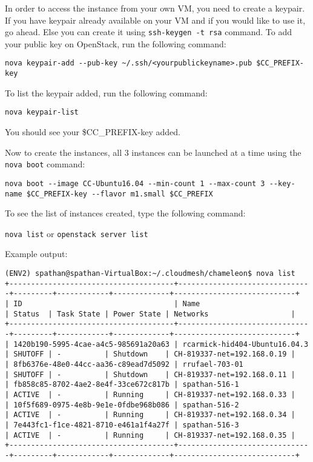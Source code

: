 In order to access the instance from your own VM, you need to create a
keypair. If you have keypair already available on your VM and if you
would like to use it, go ahead. Else you can create it using
\texttt{ssh-keygen\ -t\ rsa} command. To add your public key on
OpenStack, run the following command:

\texttt{nova\ keypair-add\ -\/-pub-key\ \textasciitilde{}/.ssh/\textless{}yourpublickeyname\textgreater{}.pub\ \$CC\_PREFIX-key}

To list the keypair added, run the following command:

\texttt{nova\ keypair-list}

You should see your \$CC\_PREFIX-key added.

Now to create the instances, all 3 instances can be launched at a time
using the \texttt{nova\ boot} command:

\texttt{nova\ boot\ -\/-image\ CC-Ubuntu16.04\ -\/-min-count\ 1\ -\/-max-count\ 3\ -\/-key-name\ \$CC\_PREFIX-key\ -\/-flavor\ m1.small\ \$CC\_PREFIX}

To see the list of instances created, type the following command:

\texttt{nova\ list} or \texttt{openstack\ server\ list}

Example output:

\begin{lstlisting}
(ENV2) spathan@spathan-VirtualBox:~/.cloudmesh/chameleon$ nova list
+--------------------------------------+-------------------------------+---------+------------+-------------+----------------------------+
| ID                                   | Name                          | Status  | Task State | Power State | Networks                   |
+--------------------------------------+-------------------------------+---------+------------+-------------+----------------------------+
| 1420b190-5995-4cae-a4c5-985691a20a63 | rcarmick-hid404-Ubuntu16.04.3 | SHUTOFF | -          | Shutdown    | CH-819337-net=192.168.0.19 |
| 8fb6376e-48e0-44cc-aa36-c89ead7d5092 | rrufael-703-01                | SHUTOFF | -          | Shutdown    | CH-819337-net=192.168.0.11 |
| fb858c85-8702-4ae2-8e4f-33ce672c817b | spathan-516-1                 | ACTIVE  | -          | Running     | CH-819337-net=192.168.0.33 |
| 10f5f689-0975-4e8b-9e1e-0fdbe968b086 | spathan-516-2                 | ACTIVE  | -          | Running     | CH-819337-net=192.168.0.34 |
| 7e443fc1-f1ce-4821-8710-e461a1f4a27f | spathan-516-3                 | ACTIVE  | -          | Running     | CH-819337-net=192.168.0.35 |
+--------------------------------------+-------------------------------+---------+------------+-------------+----------------------------+
\end{lstlisting}


